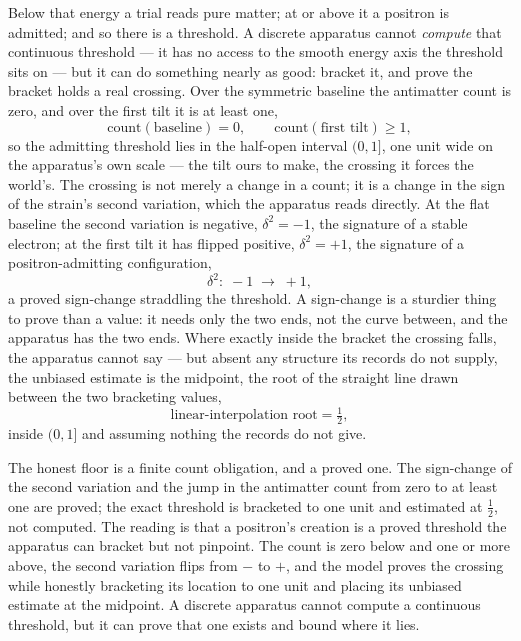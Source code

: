 Below that energy a trial reads pure matter; at or above it a positron is admitted; and so there is a
threshold. A discrete apparatus cannot \emph{compute} that continuous threshold --- it has no access to the
smooth energy axis the threshold sits on --- but it can do something nearly as good: bracket it, and prove the
bracket holds a real crossing. Over the symmetric baseline the antimatter count is zero, and over the first
tilt it is at least one,
\begin{equation}
  \text{count}(\text{baseline}) = 0, \qquad \text{count}(\text{first tilt}) \ge 1,
\end{equation}
so the admitting threshold lies in the half-open interval $(0, 1]$, one unit wide on the apparatus's own scale
--- the tilt ours to make, the crossing it forces the world's. The crossing is not merely a change in a count; it is a change in the sign of the strain's second variation,
which the apparatus reads directly. At the flat baseline the second variation is negative, $\delta^2 = -1$, the
signature of a stable electron; at the first tilt it has flipped positive, $\delta^2 = +1$, the signature of a
positron-admitting configuration,
\begin{equation}
  \delta^2 : \; -1 \;\longrightarrow\; +1,
\end{equation}
a proved sign-change straddling the threshold. A sign-change is a sturdier thing to prove than a value: it
needs only the two ends, not the curve between, and the apparatus has the two ends. Where exactly inside the
bracket the crossing falls, the apparatus cannot say --- but absent any structure its records do not supply,
the unbiased estimate is the midpoint, the root of the straight line drawn between the two bracketing values,
\begin{equation}
  \text{linear-interpolation root} = \tfrac12,
\end{equation}
inside $(0, 1]$ and assuming nothing the records do not give.

The honest floor is a finite count obligation, and a proved one. The sign-change of the second variation and
the jump in the antimatter count from zero to at least one are proved; the exact threshold is bracketed to one
unit and estimated at $\tfrac12$, not computed. The reading is that a positron's creation is a proved threshold
the apparatus can bracket but not pinpoint. The count is zero below and one or more above, the second variation
flips from $-$ to $+$, and the model proves the crossing while honestly bracketing its location to one unit and
placing its unbiased estimate at the midpoint. A discrete apparatus cannot compute a continuous threshold, but
it can prove that one exists and bound where it lies.

